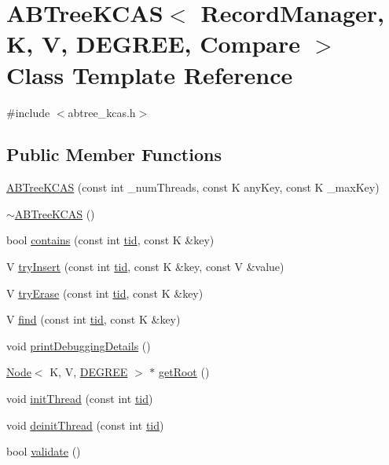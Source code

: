 \hypertarget{classABTreeKCAS}{}\section{A\+B\+Tree\+K\+C\+AS$<$ Record\+Manager, K, V, D\+E\+G\+R\+EE, Compare $>$ Class Template Reference}
\label{classABTreeKCAS}


{\ttfamily \#include $<$abtree\+\_\+kcas.\+h$>$}

\subsection*{Public Member Functions}
\begin{DoxyCompactItemize}
\item 
\hyperlink{classABTreeKCAS_a6aa4cca674313f303c0474e024bf2107}{A\+B\+Tree\+K\+C\+AS} (const int \+\_\+num\+Threads, const K any\+Key, const K \+\_\+max\+Key)
\item 
\hyperlink{classABTreeKCAS_adb05d6d43ab65e753362a01f3efaedd5}{$\sim$\+A\+B\+Tree\+K\+C\+AS} ()
\item 
bool \hyperlink{classABTreeKCAS_a620f11222c176da04b8ee4293805e4af}{contains} (const int \hyperlink{microbench_2main_8cpp_a9ca9869868fe7e7a38a921cc7de4103f}{tid}, const K \&key)
\item 
V \hyperlink{classABTreeKCAS_a094f81e654a86f774925b0e9d268a778}{try\+Insert} (const int \hyperlink{microbench_2main_8cpp_a9ca9869868fe7e7a38a921cc7de4103f}{tid}, const K \&key, const V \&value)
\item 
V \hyperlink{classABTreeKCAS_aec66944edfa684a080be76910cc5ca56}{try\+Erase} (const int \hyperlink{microbench_2main_8cpp_a9ca9869868fe7e7a38a921cc7de4103f}{tid}, const K \&key)
\item 
V \hyperlink{classABTreeKCAS_aa1c24f0116a4a83ef37fd75a2b129d94}{find} (const int \hyperlink{microbench_2main_8cpp_a9ca9869868fe7e7a38a921cc7de4103f}{tid}, const K \&key)
\item 
void \hyperlink{classABTreeKCAS_affa4e717faf0e06819819c6c20c548c9}{print\+Debugging\+Details} ()
\item 
\hyperlink{classNode}{Node}$<$ K, V, \hyperlink{brown__sigouin__abtree__kcas_2adapter_8h_a5d88b17d70c985f2f2b8e987037fd6dd}{D\+E\+G\+R\+EE} $>$ $\ast$ \hyperlink{classABTreeKCAS_afdec82be1b5a8694c04e242549e4dff3}{get\+Root} ()
\item 
void \hyperlink{classABTreeKCAS_a4cf7b4d16d93940cc660a636a86e2601}{init\+Thread} (const int \hyperlink{microbench_2main_8cpp_a9ca9869868fe7e7a38a921cc7de4103f}{tid})
\item 
void \hyperlink{classABTreeKCAS_a62ba1b3a6bfdf69807cfaa58b4de4f00}{deinit\+Thread} (const int \hyperlink{microbench_2main_8cpp_a9ca9869868fe7e7a38a921cc7de4103f}{tid})
\item 
bool \hyperlink{classABTreeKCAS_a78a291f570e7f05dd4890722fd1861e1}{validate} ()
\end{DoxyCompactItemize}
